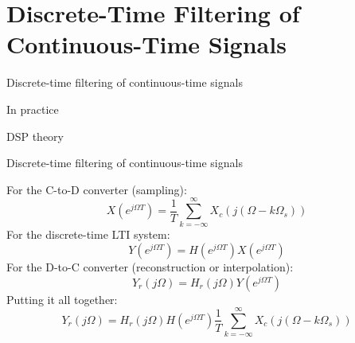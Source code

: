 \documentclass[10pt, aspectratio=169]{beamer}
\begin{document}
\section{Discrete-Time Filtering of Continuous-Time Signals}
\begin{frame}{Discrete-time filtering of continuous-time signals}
	\begin{block}{In practice}
		\begin{center}
			\resizebox{0.9\linewidth}{!}{}
		\end{center}
	\end{block}

	\begin{block}{DSP theory}
		\begin{center}
			\resizebox{0.9\linewidth}{!}{}
		\end{center}
	\end{block}
\end{frame}

\begin{frame}{Discrete-time filtering of continuous-time signals}
	\vspace{-0.2cm}
	\begin{center}
		\resizebox{0.65\linewidth}{!}{}
	\end{center}
	\pause
	For the C-to-D converter (sampling):
	\begin{equation*}
		X(e^{j\Omega T}) = \frac{1}{T}\sum_{k=-\infty}^{\infty}X_c(j(\Omega - k\Omega_s))
	\end{equation*}
	\pause
	For the discrete-time LTI system:
	\begin{equation*}
	Y(e^{j\Omega T}) = H(e^{j\Omega T})X(e^{j\Omega T}) \tag{using $\omega = \Omega T$}
	\end{equation*}
	\pause
	For the D-to-C converter (reconstruction or interpolation):
	\begin{equation*}
	Y_r(j\Omega) = H_r(j\Omega)Y(e^{j\Omega T})
	\end{equation*}
	\pause
	Putting it all together:
	\begin{equation*}
		Y_r(j\Omega) = H_r(j\Omega)H(e^{j\Omega T})\frac{1}{T}\sum_{k=-\infty}^{\infty}X_c(j(\Omega - k\Omega_s))
	\end{equation*}
\end{frame}
\end{document}
